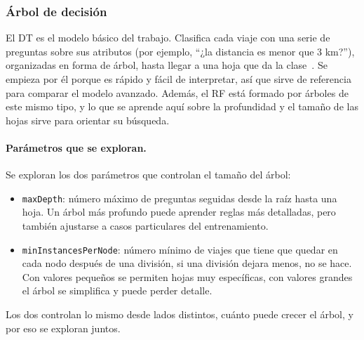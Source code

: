 \documentclass[12pt,a4paper]{article}
\begin{document}
\subsubsection{Árbol de decisión}
\label{sec:seleccion-dt}
 
El \ac{DT} es el modelo básico del trabajo. Clasifica cada viaje con una
serie de preguntas sobre sus atributos (por ejemplo, ``¿la distancia es
menor que 3 km?''), organizadas en forma de árbol, hasta llegar a una hoja
que da la clase~\cite{spark_dt}. Se empieza por él porque es rápido y fácil
de interpretar, así que sirve de referencia para comparar el modelo
avanzado. Además, el \ac{RF} está formado por árboles de este mismo tipo,
y lo que se aprende aquí sobre la profundidad y el tamaño de las hojas sirve
para orientar su búsqueda.
 
\paragraph{Parámetros que se exploran.} Se exploran los dos parámetros que
controlan el tamaño del árbol:
\begin{itemize}
    \item \texttt{maxDepth}: número máximo de preguntas seguidas desde la
    raíz hasta una hoja. Un árbol más profundo puede aprender reglas más
    detalladas, pero también ajustarse a casos particulares del
    entrenamiento.
    \item \texttt{minInstancesPerNode}: número mínimo de viajes que tiene
    que quedar en cada nodo después de una división, si una división dejara
    menos, no se hace. Con valores pequeños se permiten hojas muy
    específicas, con valores grandes el árbol se simplifica y puede perder
    detalle.
\end{itemize}
Los dos controlan lo mismo desde lados distintos, cuánto puede crecer el
árbol, y por eso se exploran juntos.
 
\end{document}
